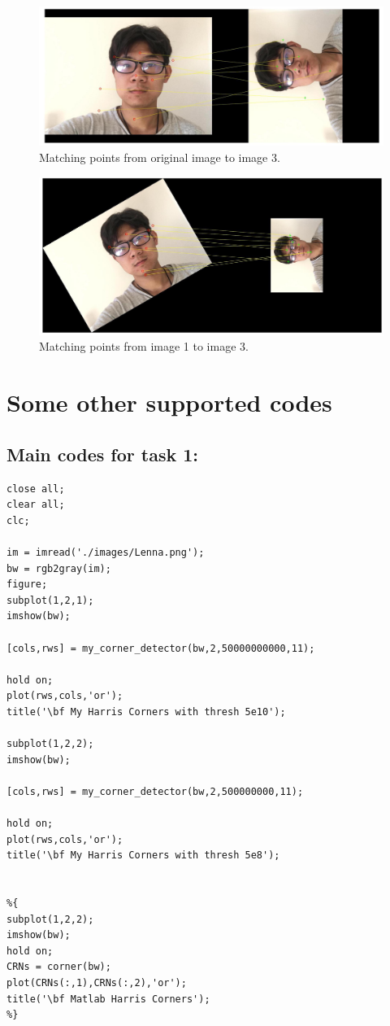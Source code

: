 \documentclass{article}
\begin{document}
\begin{figure}[htbp]
    \centering
    \includegraphics[scale = 0.1]{fig23.jpg}
    \caption{Matching points from original image to image 3.}
    \label{fig23}
\end{figure}

\begin{figure}[htbp]
    \centering
    \includegraphics[scale = 0.1]{fig24.jpg}
    \caption{Matching points from image 1 to image 3.}
    \label{fig24}
\end{figure}


\section*{Some other supported codes}
\subsection*{Main codes for task 1:}
\begin{lstlisting}
close all;
clear all;
clc;

im = imread('./images/Lenna.png');
bw = rgb2gray(im);
figure;
subplot(1,2,1);
imshow(bw);

[cols,rws] = my_corner_detector(bw,2,50000000000,11);

hold on;
plot(rws,cols,'or');
title('\bf My Harris Corners with thresh 5e10');

subplot(1,2,2);
imshow(bw);

[cols,rws] = my_corner_detector(bw,2,500000000,11);

hold on;
plot(rws,cols,'or');
title('\bf My Harris Corners with thresh 5e8');


%{
subplot(1,2,2);
imshow(bw);
hold on;
CRNs = corner(bw);
plot(CRNs(:,1),CRNs(:,2),'or');
title('\bf Matlab Harris Corners');
%}

\end{lstlisting}
\end{document}
